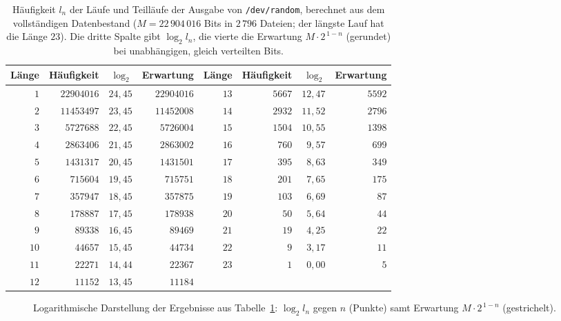 \documentclass[11pt,a4paper]{scrartcl}
\theoremstyle{plain}
\theoremstyle{definition}
\theoremstyle{remark}
\begin{document}
\begin{table}[htbp]
\centering
\begin{tabular}{rrrrrrrr}
\toprule
Länge & Häufigkeit & $\log_2$ & Erwartung & Länge & Häufigkeit & $\log_2$ & Erwartung\\
\midrule
$1$&$22904016$&$24{,}45$&$22904016$&$13$&$5667$&$12{,}47$&$5592$\\
$2$&$11453497$&$23{,}45$&$11452008$&$14$&$2932$&$11{,}52$&$2796$\\
$3$&$5727688$&$22{,}45$&$5726004$&$15$&$1504$&$10{,}55$&$1398$\\
$4$&$2863406$&$21{,}45$&$2863002$&$16$&$760$&$9{,}57$&$699$\\
$5$&$1431317$&$20{,}45$&$1431501$&$17$&$395$&$8{,}63$&$349$\\
$6$&$715604$&$19{,}45$&$715751$&$18$&$201$&$7{,}65$&$175$\\
$7$&$357947$&$18{,}45$&$357875$&$19$&$103$&$6{,}69$&$87$\\
$8$&$178887$&$17{,}45$&$178938$&$20$&$50$&$5{,}64$&$44$\\
$9$&$89338$&$16{,}45$&$89469$&$21$&$19$&$4{,}25$&$22$\\
$10$&$44657$&$15{,}45$&$44734$&$22$&$9$&$3{,}17$&$11$\\
$11$&$22271$&$14{,}44$&$22367$&$23$&$1$&$0{,}00$&$5$\\
$12$&$11152$&$13{,}45$&$11184$& & & &\\
\bottomrule
\end{tabular}
\caption{Häufigkeit $l_n$ der Läufe und Teilläufe der Ausgabe von
\texttt{/dev/random}, berechnet aus dem vollständigen Datenbestand
($M=22\,904\,016$ Bits in $2\,796$ Dateien; der längste Lauf hat die
Länge $23$). Die dritte Spalte gibt $\log_2 l_n$, die vierte die
Erwartung $M\cdot 2^{\,1-n}$ (gerundet) bei unabhängigen, gleich
verteilten Bits.}
\label{tab:haeufigkeiten}
\end{table}

\begin{figure}[htbp]
\centering
{}
\caption{Logarithmische Darstellung der Ergebnisse aus
Tabelle~\ref{tab:haeufigkeiten}: $\log_2 l_n$ gegen $n$ (Punkte) samt
Erwartung $M\cdot 2^{\,1-n}$ (gestrichelt).}
\label{fig:haeufigkeiten}
\end{figure}
\end{document}
